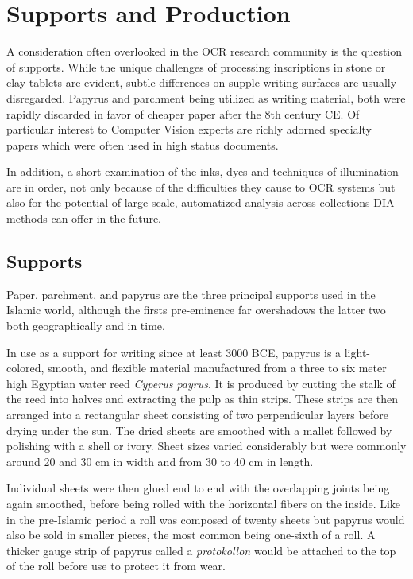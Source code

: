 \section{Supports and Production}

A consideration often overlooked in the OCR research community is the question
of supports. While the unique challenges of processing inscriptions in stone or
clay tablets are evident, subtle differences on supple writing surfaces are
usually disregarded. Papyrus and parchment being utilized as writing
material, both were rapidly discarded in favor of cheaper paper after the 8th
century CE. Of particular interest to Computer Vision experts are richly
adorned specialty papers which were often used in high status documents.

In addition, a short examination of the inks, dyes and techniques of
illumination are in order, not only because of the difficulties they cause to
OCR systems but also for the potential of large scale, automatized analysis
across collections DIA methods can offer in the future.

\subsection{Supports}

Paper, parchment, and papyrus are the three principal supports used in the
Islamic world, although the firsts pre-eminence far overshadows the latter two
both geographically and in time.

In use as a support for writing since at least 3000 BCE, papyrus is a
light-colored, smooth, and flexible material manufactured from a three to six
meter high Egyptian water reed \emph{Cyperus payrus}. It is produced by cutting
the stalk of the reed into halves and extracting the pulp as thin strips.
These strips are then arranged into a rectangular sheet consisting of two
perpendicular layers before drying under the sun. The dried sheets are smoothed
with a mallet followed by polishing with a shell or ivory. Sheet sizes varied
considerably but were commonly around 20 and 30 cm in width and from 30 to 40
cm in length.

Individual sheets were then glued end to end with the overlapping joints being
again smoothed, before being rolled with the horizontal fibers on the inside.
Like in the pre-Islamic period a roll was composed of twenty sheets but papyrus
would also be sold in smaller pieces, the most common being one-sixth of a
roll. A thicker gauge strip of papyrus called a \emph{protokollon} would be
attached to the top of the roll before use to protect it from wear.

